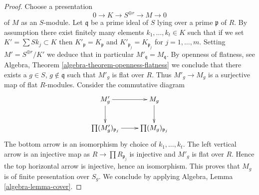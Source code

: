 \documentclass[10pt,a4paper]{amsart}
\theoremstyle{plain}
\theoremstyle{definition}
\theoremstyle{remark}
\numberwithin{equation}{subsection}
\begin{document}
\begin{proof}
Choose a presentation
$$
0 \to K \to S^{\oplus r} \to M \to 0
$$
of $M$ as an $S$-module. Let $\mathfrak q$ be a prime ideal of $S$
lying over a prime $\mathfrak p$ of $R$. By assumption there exist
finitely many elements $k_1, \ldots, k_t \in K$ such that if we set
$K' = \sum Sk_j \subset K$ then
$K'_{\mathfrak p} = K_{\mathfrak p}$ and
$K'_{\mathfrak p_j} = K_{\mathfrak p_j}$ for $j = 1, \ldots, m$.
Setting $M' = S^{\oplus r}/K'$ we deduce that in particular
$M'_{\mathfrak q} = M_{\mathfrak q}$. By openness of flatness, see
Algebra, Theorem \ref{algebra-theorem-openness-flatness}
we conclude that there exists a $g \in S$, $g \not \in \mathfrak q$
such that $M'_g$ is flat over $R$. Thus $M'_g \to M_g$ is a surjective
map of flat $R$-modules. Consider the commutative diagram
$$
\xymatrix{
M'_g \ar[r] \ar[d] & M_g \ar[d] \\
\prod (M'_g)_{\mathfrak p_j} \ar[r] & \prod (M_g)_{\mathfrak p_j}
}
$$
The bottom arrow is an isomorphism by choice of $k_1, \ldots, k_t$.
The left vertical arrow is an injective map as
$R \to \prod R_{\mathfrak p_j}$ is injective and $M'_g$ is flat over $R$.
Hence the top horizontal arrow is injective, hence an isomorphism.
This proves that $M_g$ is of finite presentation over $S_g$.
We conclude by applying
Algebra, Lemma \ref{algebra-lemma-cover}.
\end{proof}
\end{document}
